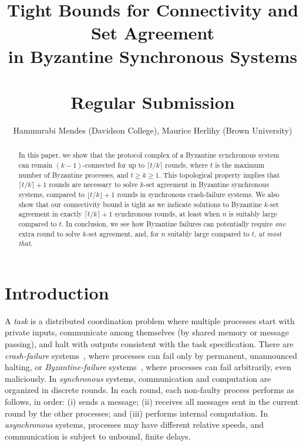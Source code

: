 \documentclass[11pt]{article}
\title{Tight Bounds for Connectivity and Set Agreement\\in Byzantine Synchronous Systems\\
~\\
{\large Regular Submission}}
\author{Hammurabi Mendes (Davidson College), Maurice Herlihy (Brown University)}
\date{}
\begin{document}
\maketitle

\begin{abstract}
In this paper,
we show that the protocol complex of a Byzantine synchronous system
can remain $(k - 1)$-connected for up to $\lceil t/k \rceil$ rounds,
where $t$ is the maximum number of Byzantine processes,
and $t \ge k \ge 1$.
This topological property implies that
$\lceil t/k \rceil + 1$ rounds are necessary to solve $k$-set agreement
in Byzantine synchronous systems,
compared to  $\lfloor t/k \rfloor + 1$ rounds in synchronous crash-failure systems.
We also show that our connectivity bound is tight
as we indicate solutions to Byzantine $k$-set agreement in exactly
$\lceil t/k \rceil + 1$ synchronous rounds,
at least when $n$ is suitably large compared to $t$.
In conclusion,
we see how Byzantine failures can potentially require \emph{one} extra round
to solve $k$-set agreement, and,
for $n$ suitably large compared to $t$, \emph{at most that}.
\end{abstract}

\section{Introduction}
\label{Sec-Introduction}

A \emph{task} is a distributed coordination problem
where multiple processes start with private inputs,
communicate among themselves (by shared memory or message passing),
and halt with outputs consistent with the task specification.
There are \emph{crash-failure} systems~\cite{DSBook},
where processes can fail only by permanent, unannounced halting,
or \emph{Byzantine-failure} systems~\cite{Lamport1982},
where processes can fail arbitrarily, even maliciously.
In \emph{synchronous} systems,
communication and computation are organized in discrete rounds.
In each round, each non-faulty process performs as follows, in order: (i) sends a message;
(ii) receives all messages sent in the current round by the other processes;
and (iii) performs internal computation.
In \emph{asynchronous} systems,
processes may have different relative speeds,
and communication is subject to unbound, finite delays.
\end{document}
